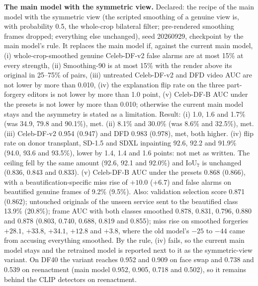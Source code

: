\documentclass[10pt]{article}
\begin{document}
\textbf{The main model with the symmetric view.} Declared: the recipe of the main model with the symmetric view (the
scripted smoothing of a genuine view is, with probability 0.5, the whole-crop bilateral filter; pre-rendered smoothing
frames dropped; everything else unchanged), seed 20260929, checkpoint by the main model's rule. It replaces the main
model if, against the current main model, (i) whole-crop-smoothed genuine Celeb-DF-v2 false alarms are at most 15\% at
every strength, (ii) Smoothing-90 is at most 15\% with the render above its original in 25--75\% of pairs, (iii)
untreated Celeb-DF-v2 and DFD video AUC are not lower by more than 0.010, (iv) the explanation flip rate on the three
part-forgery editors is not lower by more than 1.0 point, (v) Celeb-DF-B AUC under the presets is not lower by more than
0.010; otherwise the current main model stays and the asymmetry is stated as a limitation. Result: (i) 1.0, 1.6 and
1.7\% (was 34.9, 79.8 and 90.1\%), met. (ii) 8.1\% and 30.0\% (was 8.6\% and 32.5\%), met. (iii) Celeb-DF-v2 0.954
(0.947) and DFD 0.983 (0.978), met, both higher. (iv) flip rate on donor transplant, SD-1.5 and SDXL inpainting 92.6,
92.2 and 91.9\% (94.0, 93.6 and 93.5\%), lower by 1.4, 1.4 and 1.6 points: not met as written. The ceiling fell by the
same amount (92.6, 92.1 and 92.0\%) and IoU$_7$ is unchanged (0.836, 0.843 and 0.833). (v) Celeb-DF-B AUC under the
presets 0.868 (0.866), with a beautification-specific miss rise of $+10.0$ ($+6.7$) and false alarms on beautified
genuine frames of 9.2\% (9.5\%). Also: validation selection score 0.871 (0.862); untouched originals of the unseen
service sent to the beautified class 13.9\% (20.8\%); frame AUC with both classes smoothed 0.878, 0.831, 0.796, 0.880
and 0.878 (0.803, 0.740, 0.688, 0.819 and 0.855); miss rise on smoothed forgeries $+28.1$, $+33.8$, $+34.1$, $+12.8$
and $+3.8$, where the old model's $-25$ to $-44$ came from accusing everything smoothed. By the rule, (iv) fails, so the
current main model stays and the retrained model is reported next to it as the symmetric-view variant. On DF40 the
variant reaches 0.952 and 0.909 on face swap and 0.738 and 0.539 on reenactment (main model 0.952, 0.905, 0.718 and
0.502), so it remains behind the CLIP detectors on reenactment.
\end{document}
